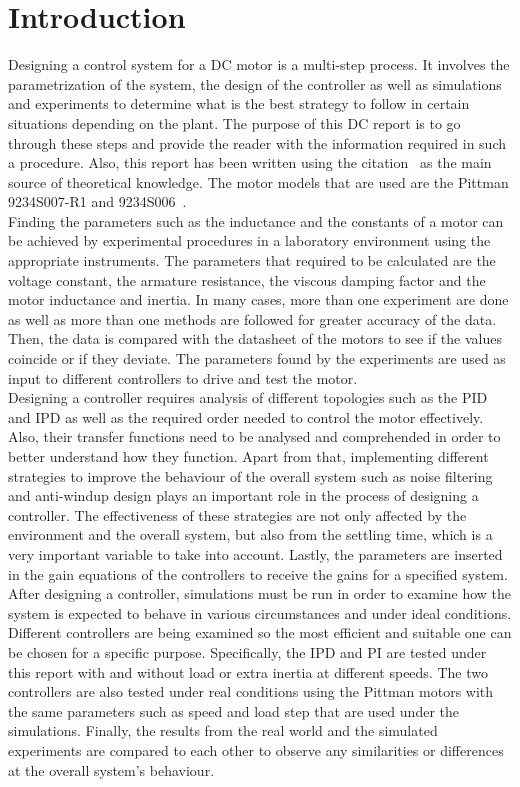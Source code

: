 \section{Introduction}

Designing a control system for a DC motor is a multi-step process. It involves the parametrization of the system, the design of the controller as well as simulations and experiments to determine what is the best strategy to follow in certain situations depending on the plant. The purpose of this DC report is to go through these steps and provide the reader with the information required in such a procedure. Also, this report has been written using the citation~\cite{feedback} as the main source of theoretical knowledge. The motor models that are used are the Pittman 9234S007-R1 and 9234S006~\cite{pittmann}.
\\

Finding the parameters such as the inductance and the constants of a motor can be achieved by experimental procedures in a laboratory environment using the appropriate instruments. The parameters that required to be calculated are the voltage constant, the armature resistance, the viscous damping factor and the motor inductance and inertia. In many cases, more than one experiment are done as well as more than one methods are followed for greater accuracy of the data. Then, the data is compared with the datasheet of the motors to see if the values coincide or if they deviate. The parameters found by the experiments are used as input to different controllers to drive and test the motor. 
\\

Designing a controller requires analysis of different topologies such as the PID and IPD as well as the required order needed to control the motor effectively. Also, their transfer functions need to be analysed and comprehended in order to better understand how they function. Apart from that, implementing different strategies to improve the behaviour of the overall system such as noise filtering and anti-windup design plays an important role in the process of designing a controller. The effectiveness of these strategies are not only affected by the environment and the overall system, but also from the settling time, which is a very important variable to take into account. Lastly, the parameters are inserted in the gain equations of the controllers to receive the gains for a specified system.
\\

After designing a controller, simulations must be run in order to examine how the system is expected to behave in various circumstances and under ideal conditions. Different controllers are being examined so the most efficient and suitable one can be chosen for a specific purpose. Specifically, the IPD and PI are tested under this report with and without load or extra inertia at different speeds. The two controllers are also tested under real conditions using the Pittman motors with the same parameters such as speed and load step that are used under the simulations. Finally, the results from the real world and the simulated experiments are compared to each other to observe any similarities or differences at the overall system's behaviour.